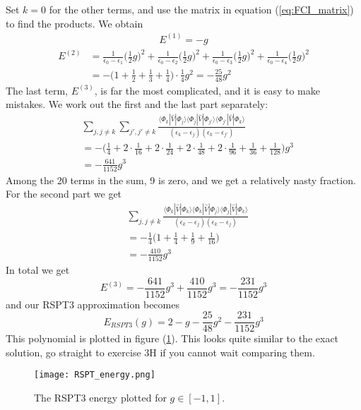 \documentclass[norsk,a4paper,12pt]{article}
\begin{document}
Set $k=0$ for the other terms, and use the matrix in equation (\ref{eq:FCI_matrix}) to find the products. We obtain
\begin{align*}
E^{(1)}=-g
\end{align*}
\begin{align*}
E^{(2)}&=\frac{1}{\epsilon_0-\epsilon_1}\Big(\frac{1}{2}g\Big)^2+\frac{1}{\epsilon_0-\epsilon_2}\Big(\frac{1}{2}g\Big)^2+\frac{1}{\epsilon_0-\epsilon_3}\Big(\frac{1}{2}g\Big)^2+\frac{1}{\epsilon_0-\epsilon_4}\Big(\frac{1}{2}g\Big)^2\\
&=-\Big(1+\frac{1}{2}+\frac{1}{3}+\frac{1}{4}\Big)\cdot\frac{1}{4}g^2=-\frac{25}{48}g^2
\end{align*}
The last term, $E^{(3)}$, is far the most complicated, and it is easy to make mistakes. We work out the first and the last part separately:
\begin{align*}
&\sum_{j,j\neq k}\sum_{j',j'\neq k}\frac{\langle\Phi_k|\hat{V}|\Phi_j\rangle\langle\Phi_j|\hat{V}|\Phi_{j'}\rangle\langle\Phi_{j'}|\hat{V}|\Phi_k\rangle}{(\epsilon_k-\epsilon_j)(\epsilon_k-\epsilon_{j'})}\\
&=-\Big(\frac{1}{4}+2\cdot\frac{1}{16}+2\cdot\frac{1}{24}+2\cdot\frac{1}{48}+2\cdot\frac{1}{96}+\frac{1}{36}+\frac{1}{128}\Big)g^3\\
&=-\frac{641}{1152}g^3
\end{align*}
Among the 20 terms in the sum, 9 is zero, and we get a relatively nasty fraction. For the second part we get
\begin{align*}
&\sum_{j,j\neq k}\frac{\langle\Phi_k|\hat{V}|\Phi_k\rangle\langle\Phi_k|\hat{V}|\Phi_{j}\rangle\langle\Phi_j|\hat{V}|\Phi_k\rangle}{(\epsilon_k-\epsilon_j)(\epsilon_k-\epsilon_j)}\\
&=-\frac{1}{4}\Big(1+\frac{1}{4}+\frac{1}{9}+\frac{1}{16}\Big)\\
&=-\frac{410}{1152}g^3
\end{align*}
In total we get 
\begin{equation*}
E^{(3)}=-\frac{641}{1152}g^3+\frac{410}{1152}g^3=-\frac{231}{1152}g^3
\end{equation*}
and our RSPT3 approximation becomes
\begin{equation}
E_{RSPT3}(g)=2-g-\frac{25}{48}g^2 - \frac{231}{1152}g^3
\end{equation}
This polynomial is plotted in figure (\ref{fig:RSPT_energy}). This looks quite similar to the exact solution, go straight to exercise 3H if you cannot wait comparing them.
\begin{figure}[h]
\centering
\texttt{[image: RSPT\_energy.png]}
\caption{The RSPT3 energy plotted for $g\in[-1, 1]$. \label{fig:RSPT_energy}}
\end{figure}
\end{document}
